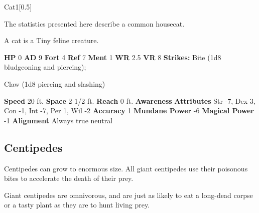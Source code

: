   
  \begin{monsection}{Cat}{1}[0.5]
    \vspace{-1em}\vspace{-1em}
    \vspace{0em}

    
      The statistics presented here describe a common housecat.
    
        A cat is a Tiny feline creature.
      

    \begin{spellcontent}
      \begin{spelltargetinginfo}
        \pari \textbf{HP} 0 \monsep
          \textbf{AD} 9 \monsep
          \textbf{Fort} 4 \monsep
          \textbf{Ref} 7 \monsep
          \textbf{Ment} 1
        \pari \textbf{WR} 2.5 \monsep
        \textbf{VR} 8
        \pari \textbf{Strikes:}
            Bite  (1d8 bludgeoning and piercing);
\par Claw  (1d8 piercing and slashing)
      \end{spelltargetinginfo}
    \end{spellcontent}
    \begin{monsterfooter}
      \pari \textbf{Speed} 20 ft. \monsep
        \textbf{Space} 2-1/2 ft. \monsep
        \textbf{Reach} 0 ft.
      \pari \textbf{Awareness} 
      \pari \textbf{Attributes}
        Str -7, Dex 3,
        Con -1, Int -7,
        Per 1, Wil -2
      \pari \textbf{Accuracy} 1 \monsep
        \textbf{Mundane Power} -6 \monsep
      \textbf{Magical Power} -1
      \pari \textbf{Alignment} Always true neutral
    \end{monsterfooter}
  \end{monsection}
  
  
    \subsection{Centipedes}
      
      Centipedes can grow to enormous size.
      All giant centipedes use their poisonous bites to accelerate the death of their prey.
    
      Giant centipedes are omnivorous, and are just as likely to eat a long-dead corpse or a tasty plant as they are to hunt living prey.
    

